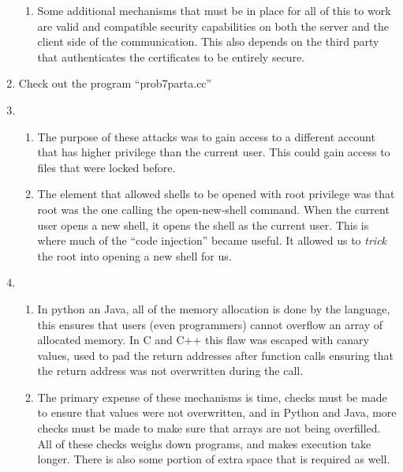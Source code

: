 \documentclass[a4paper, 11pt]{article}
\begin{document}
\begin{enumerate}
\begin{enumerate}
    \item
      Some additional mechanisms that must be in place for all of this
      to work are valid and compatible security capabilities on both
      the server and the client side of the communication.  This also
      depends on the third party that authenticates the certificates
      to be entirely secure.
        
  \end{enumerate}

\item
  Check out the program ``prob7parta.cc''\\  

\item
  \begin{enumerate}
    \item
      The purpose of these attacks was to gain access to a different
      account that has higher privilege than the current user.  This
      could gain access to files that were locked before.

    \item
      The element that allowed shells to be opened with root privilege
      was that root was the one calling the open-new-shell command.
      When the current user opens a new shell, it opens the shell as
      the current user.  This is where much of the ``code injection''
      became useful.  It allowed us to \textit{trick} the root into
      opening a new shell for us.

  \end{enumerate}

\item
  \begin{enumerate}
    \item
      In python an Java, all of the memory allocation is done by the
      language, this ensures that users (even programmers) cannot
      overflow an array of allocated memory.  In C and C++ this flaw
      was escaped with canary values, used to pad the return addresses
      after function calls ensuring that the return address was not
      overwritten during the call.

    \item
      The primary expense of these mechanisms is time, checks must be
      made to ensure that values were not overwritten, and in Python
      and Java, more checks must be made to make sure that arrays are
      not being overfilled.  All of these checks weighs down programs,
      and makes execution take longer.  There is also some portion of
      extra space that is required as well.

  \end{enumerate}


\end{enumerate}
\end{document}
